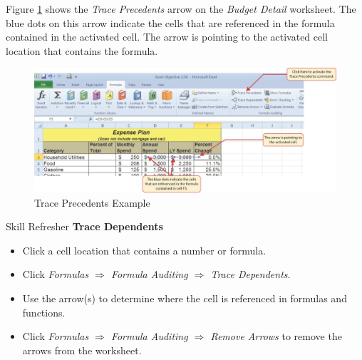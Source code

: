 Figure \ref{02:fig10} shows the \textit{Trace Precedents} arrow on the \textit{Budget Detail} worksheet. The blue dots on this arrow indicate the cells that are referenced in the formula contained in the activated cell. The arrow is pointing to the activated cell location that contains the formula.

\begin{figure}[H]
	\centering
	\includegraphics[width=\maxwidth{.95\linewidth}]{gfx/ch02_fig10}
	\caption{Trace Precedents Example}
	\label{02:fig10}
\end{figure}

\begin{center}
	\begin{sklbox}{Skill Refresher}
		\textbf{Trace Dependents}
		\\
		\begin{itemize}
			\setlength{\itemsep}{0pt}
			\setlength{\parskip}{0pt}
			\setlength{\parsep}{0pt}
			
			\item Click a cell location that contains a number or formula.
			\item Click \textit{Formulas $ \Rightarrow $ Formula Auditing $ \Rightarrow $ Trace Dependents}.
			\item Use the arrow(s) to determine where the cell is referenced in formulas and functions.
			\item Click \textit{Formulas $ \Rightarrow $ Formula Auditing $ \Rightarrow $ Remove Arrows} to remove the arrows from the worksheet.
			
		\end{itemize}
	\end{sklbox}
\end{center}

